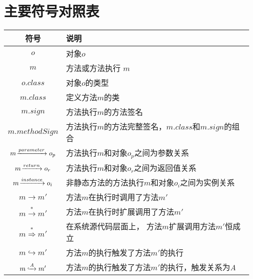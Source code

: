 




\chapter*{主要符号对照表}




\begin{table*}[!ht]
\centering

\begin{tabular}{|c|p{11cm}|}
\hline
符号&说明\\
\hline
$o$ & 对象$o$\\
\hline
$m$ & 方法或方法执行 $m$\\
\hline	
$o.class$ &对象$o$的类型 \\ 
\hline	
$m.class$ & 定义方法$m$的类 \\
\hline	
$m.sign$ & 方法执行$m$的方法签名 \\
\hline	
 $m.methodSign$  &方法执行$m$的方法完整签名，$m.class$和$m.sign$的组合 \\
\hline	
 $m \joinrel\xrightarrow{parameter} o_p$  &  方法执行$m$和对象$o_p$之间为参数关系  \\
\hline 
$m \joinrel\xrightarrow{return} o_r$& 方法执行$m$和对象$o_r$之间为返回值关系  \\
\hline
$m \joinrel\xrightarrow{instance} o_i$&   非静态方法的方法执行$m$和对象$o_i$之间为实例关系\\
\hline
$m \to m'$ & 方法$m$在执行时调用了方法$m'$\\
\hline
$m \stackrel{\ast}{\to} m' $ &  方法$m$在执行时扩展调用了方法$m'$\\
\hline
$m  \stackrel{\ast}{ \Rightarrow } m'$ &在系统源代码层面上， 方法$m$扩展调用方法$m'$恒成立 \\
\hline
$m \hookrightarrow m'$ & 方法$m$的执行触发了方法$m'$的执行 \\
\hline					
$m \lhook\joinrel\xrightarrow{\text{\textit{A}}}  m' $& 方法$m$的执行触发了方法$m'$的执行，触发关系为\textit{A}\\
\hline
\end{tabular}
\end{table*}





